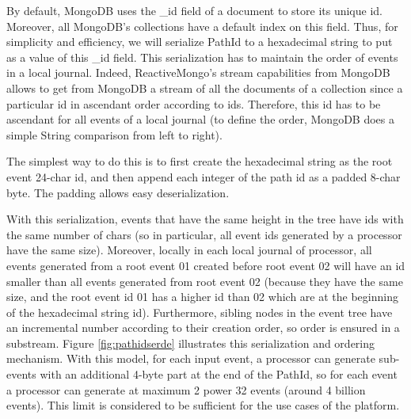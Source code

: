 By default, MongoDB uses the \_id field of a document to store its unique id. Moreover, all MongoDB's collections have a default index on this field. Thus,
for simplicity and efficiency, we will serialize PathId to a hexadecimal string to put as a value of this \_id field. This serialization has to maintain the order
of events in a local journal. Indeed, ReactiveMongo's stream capabilities from MongoDB allows to get from MongoDB a stream of all the documents of a collection since a particular id in ascendant order according to ids. Therefore, this id has to be ascendant for all events of a local journal (to define the order, MongoDB does a simple String comparison from left to right).

The simplest way to do this is to first create the hexadecimal string as the root event 24-char id, and then append each integer of the path id as a padded 8-char byte. The padding allows easy deserialization.

With this serialization, events that have the same height in the tree have ids with the same number of chars (so in particular, all event ids generated by a processor have the same size). Moreover, locally in each local journal of processor, all events generated from a root event 01 created before root event 02 will have an id smaller than all events
generated from root event 02 (because they have the same size, and the root event id 01 has a higher id than 02 which are at the beginning of the hexadecimal string id). Furthermore,
sibling nodes in the event tree have an incremental number according to their creation order, so order is ensured in a substream. Figure \ref{fig:pathidserde} illustrates this serialization and ordering mechanism. With this model, for each input event, a processor can generate sub-events with an additional 4-byte part at the end of the PathId, so
for each event a processor can generate at maximum 2 power 32 events (around 4 billion events). This limit is considered to be sufficient for the use cases of the platform.

